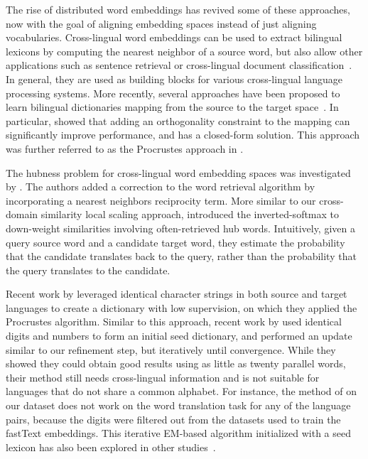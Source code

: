 \documentclass{article} \usepackage{iclr2018_conference,times}
\begin{document}
The rise of distributed word embeddings has revived some of these approaches, now with the goal of aligning embedding spaces instead of just aligning vocabularies. Cross-lingual word embeddings can be used to extract bilingual lexicons by computing the nearest neighbor of a source word, but also allow other applications such as sentence retrieval or cross-lingual document classification~\citep{klementiev2012inducing}. In general, they are used as building blocks for various cross-lingual language processing systems. More recently, several approaches have been proposed to learn bilingual dictionaries mapping from the source to the target space~\citep{mikolov2013exploiting, zou2013bilingual, faruqui2014improving, ammar2016massively}. In particular, \citet{xing2015normalized} showed that adding an orthogonality constraint to the mapping can significantly improve performance, and has a closed-form solution. This approach was further referred to as the Procrustes approach in \citet{smith2017offline}.

The hubness problem for cross-lingual word embedding spaces was investigated by \citet{dinu2014improving}. The authors added a correction to the word retrieval algorithm by incorporating a nearest neighbors reciprocity term. More similar to our cross-domain similarity local scaling approach, \citet{smith2017offline} introduced the inverted-softmax to down-weight similarities involving often-retrieved hub words. Intuitively, given a query source word and a candidate target word, they estimate the probability that the candidate translates back to the query, rather than the probability that the query translates to the candidate.

Recent work by \citet{smith2017offline} leveraged identical character strings in both source and target languages to create a dictionary with low supervision, on which they applied the Procrustes algorithm. Similar to this approach, recent work by \citet{artetxe} used identical digits and numbers to form an initial seed dictionary, and performed an update similar to our refinement step, but iteratively until convergence. While they showed they could obtain good results using as little as twenty parallel words, their method still needs cross-lingual information and is not suitable for languages that do not share a common alphabet. For instance, the method of \citet{artetxe} on our dataset does not work on the word translation task for any of the language pairs, because the digits were filtered out from the datasets used to train the fastText embeddings. This iterative EM-based algorithm initialized with a seed lexicon has also been explored in other studies~\citep{haghighi2008learning, Kondrak2017BootstrappingUB}.
\end{document}
